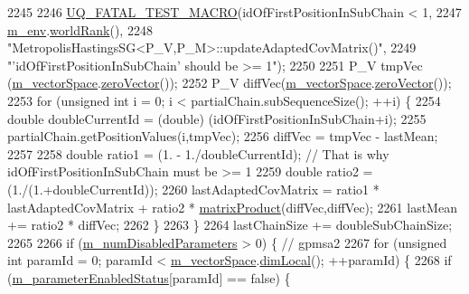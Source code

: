 \begin{DoxyCode}
2245 
2246     \hyperlink{_defines_8h_a56d63d18d0a6d45757de47fcc06f574d}{UQ\_FATAL\_TEST\_MACRO}(idOfFirstPositionInSubChain < 1,
2247                         \hyperlink{class_q_u_e_s_o_1_1_metropolis_hastings_s_g_ac8ea061e55b920e0c8f9bce5c3f20e52}{m\_env}.\hyperlink{class_q_u_e_s_o_1_1_base_environment_a78b57112bbd0e6dd0e8afec00b40ffa7}{worldRank}(),
2248                         \textcolor{stringliteral}{"MetropolisHastingsSG<P\_V,P\_M>::updateAdaptedCovMatrix()"},
2249                         \textcolor{stringliteral}{"'idOfFirstPositionInSubChain' should be >= 1"});
2250 
2251     P\_V tmpVec (\hyperlink{class_q_u_e_s_o_1_1_metropolis_hastings_s_g_a2ef17fbfc6a156f03bbfad044b5a75f5}{m\_vectorSpace}.\hyperlink{class_q_u_e_s_o_1_1_vector_space_a92e963bb5cab3eecd290dfe4b8f03b04}{zeroVector}());
2252     P\_V diffVec(\hyperlink{class_q_u_e_s_o_1_1_metropolis_hastings_s_g_a2ef17fbfc6a156f03bbfad044b5a75f5}{m\_vectorSpace}.\hyperlink{class_q_u_e_s_o_1_1_vector_space_a92e963bb5cab3eecd290dfe4b8f03b04}{zeroVector}());
2253     \textcolor{keywordflow}{for} (\textcolor{keywordtype}{unsigned} \textcolor{keywordtype}{int} i = 0; i < partialChain.subSequenceSize(); ++i) \{
2254       \textcolor{keywordtype}{double} doubleCurrentId  = (double) (idOfFirstPositionInSubChain+i);
2255       partialChain.getPositionValues(i,tmpVec);
2256       diffVec = tmpVec - lastMean;
2257 
2258       \textcolor{keywordtype}{double} ratio1         = (1. - 1./doubleCurrentId); \textcolor{comment}{// That is why idOfFirstPositionInSubChain must be
       >= 1}
2259       \textcolor{keywordtype}{double} ratio2         = (1./(1.+doubleCurrentId));
2260       lastAdaptedCovMatrix  = ratio1 * lastAdaptedCovMatrix + ratio2 * 
      \hyperlink{namespace_q_u_e_s_o_aea04e232d5d3dd76349a85bb8acf9e17}{matrixProduct}(diffVec,diffVec);
2261       lastMean             += ratio2 * diffVec;
2262     \}
2263   \}
2264   lastChainSize += doubleSubChainSize;
2265 
2266   \textcolor{keywordflow}{if} (\hyperlink{class_q_u_e_s_o_1_1_metropolis_hastings_s_g_a43a883aa28c81ed99e5f0cd9de93889b}{m\_numDisabledParameters} > 0) \{ \textcolor{comment}{// gpmsa2}
2267     \textcolor{keywordflow}{for} (\textcolor{keywordtype}{unsigned} \textcolor{keywordtype}{int} paramId = 0; paramId < \hyperlink{class_q_u_e_s_o_1_1_metropolis_hastings_s_g_a2ef17fbfc6a156f03bbfad044b5a75f5}{m\_vectorSpace}.\hyperlink{class_q_u_e_s_o_1_1_vector_space_a5829a1f4f996f8307c840b705144d666}{dimLocal}(); ++paramId) \{
2268       \textcolor{keywordflow}{if} (\hyperlink{class_q_u_e_s_o_1_1_metropolis_hastings_s_g_afce8eeadae98935c72727b3640e88a31}{m\_parameterEnabledStatus}[paramId] == \textcolor{keyword}{false}) \{

\end{DoxyCode}
